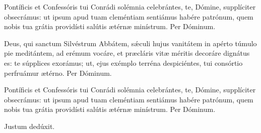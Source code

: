 \documentclass[fontsize=9pt,paper=A6,twoside,BCOR=1mm,DIV=22,headinclude]{scrarticle}
\begin{document}
\begin{multicols}{2}
{\RVCPvi


}


\VRCPii

\BCP

 Pontíficis et Confessóris tui Conrádi solémnia celebrántes, te, Dómine, supplíciter obsecrámus: ut ipsum apud tuam cleméntiam sentiámus habére patrónum, quem nobis tua grátia providísti salútis ætérnæ minístrum. Per Dóminum.


\AiiC 

\VRCi 

\columnbreak
{}
 Deus, qui sanctum Silvéstrum Abbátem, sǽculi hujus vanitátem in apérto túmulo pie meditántem, ad erémum vocáre, et præcláris vitæ méritis decoráre dignátus es: te súpplices exorámus; ut, ejus exémplo terréna despiciéntes, tui consórtio perfruámur ætérno. Per Dóminum.


\VRCPiii 

\MiiCP



\columnbreak
{}

\AiCP 

\VRCPi 

 Pontíficis et Confessóris tui Conrádi solémnia celebrántes, te, Dómine, supplíciter obsecrámus: ut ipsum apud tuam cleméntiam sentiámus habére patrónum, quem nobis tua grátia providísti salútis ætérnæ minístrum. Per Dóminum.


\AiiCP

\VRCPii 

 

\AiiiCP

\V Justum dedúxit.



\end{multicols}
\end{document}
